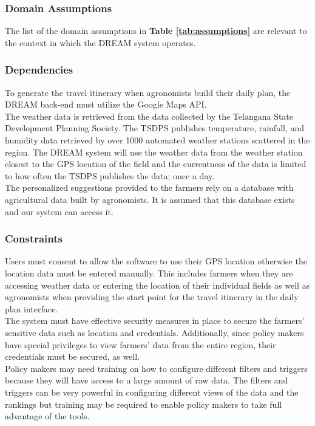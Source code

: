 \subsubsection{Domain Assumptions}

\begin{flushleft}
The list of the domain assumptions in \textbf{Table \ref{tab:assumptions}} are relevant to the context in which the DREAM system operates. 
\end{flushleft} 



\subsubsection{Dependencies}
\begin{flushleft}
To generate the travel itinerary when agronomists build their daily plan, the DREAM back-end must utilize the Google Maps API. \\
\smallskip 
The weather data is retrieved from the data collected by the Telangana State Development Planning Society. The TSDPS publishes temperature, rainfall, and humidity data retrieved by over 1000 automated weather stations scattered in the region. The DREAM system will use the weather data from the weather station closest to the GPS location of the field and the currentness of the data is limited to how often the TSDPS publishes the data; once a day. \\
\smallskip
The personalized suggestions provided to the farmers rely on a database with agricultural data built by agronomists. It is assumed that this database exists and our system can access it. \\
\end{flushleft}

\subsubsection{Constraints}
\begin{flushleft}
Users must consent to allow the software to use their GPS location otherwise the location data must be entered manually. This includes farmers when they are accessing weather data or entering the location of their individual fields as well as agronomists when providing the start point for the travel itinerary in the daily plan interface. \\
\smallskip
The system must have effective security measures in place to secure the farmers' sensitive data such as location and credentials. Additionally, since policy makers have special privileges to view farmers' data from the entire region, their credentials must be secured, as well. \\
\smallskip
Policy makers may need training on how to configure different filters and triggers because they will have access to a large amount of raw data. The filters and triggers can be very powerful in configuring different views of the data and the rankings but training may be required to enable policy makers to take full advantage of the tools. 
\end{flushleft}
